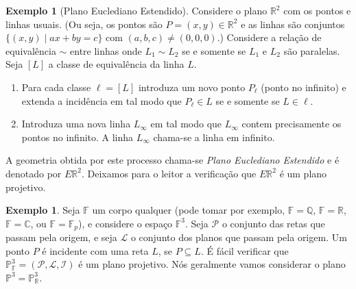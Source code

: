 \documentclass[12pt]{amsart}
\newcommand{\F}{\mathbb F}
\renewcommand{\L}{\mathbb L}
\newcommand{\Q}{\mathbb Q}
\newcommand{\C}{\mathbb C}
\newcommand{\R}{\mathbb R}
\theoremstyle{definition}
\newtheorem{example}[theorem]{Exemplo}
\renewcommand{\P}{\mathcal P}
\renewcommand{\L}{\mathcal L}
\newcommand{\I}{\mathcal I}
\newcommand{\PP}{\mathbb P}
\begin{document}
\begin{example}[Plano Euclediano Estendido]
    Considere o plano $\R^2$ com os pontos e linhas usuais. (Ou seja, os pontos são $P=(x,y)\in\R^2$ e as linhas 
    são conjuntos $\{(x,y)\mid ax+by=c\}$ com $(a,b,c)\neq (0,0,0)$.)
    Considere a relação de equivalência $\sim$ entre linhas 
    onde $L_1\sim L_2$ se e somente se $L_1$ e $L_2$ são paralelas. 
    Seja $[L]$ a classe de equivalência da linha $L$. 
    \begin{enumerate}
        \item Para cada classe $\ell=[L]$ introduza um novo ponto $P_\ell$ (ponto no infinito) e extenda 
    a incidência em tal modo que  $P_\ell\in L$ se e somente se $L\in \ell$.
    \item Introduza uma nova linha $L_\infty$ em tal modo que $L_\infty$ contem precisamente os pontos no infinito. A linha $L_\infty$ chama-se a linha em infinito.
    \end{enumerate}    
    A geometria obtida por este processo chama-se 
    \emph{Plano Euclediano Estendido} e é denotado por $E\R^2$. Deixamos para o leitor a verificação que $E\R^2$ é um plano projetivo.
\end{example}

\begin{example}
    Seja $\F$ um corpo qualquer (pode tomar por exemplo, $\F=\Q$, $\F=\R$, $\F=\C$, ou $\F=\F_p$), e considere 
    o espaço $\F^3$. Seja $\P$ o conjunto das retas que passam pela origem, e seja $\L$ o conjunto dos planos que passam pela origem. Um ponto $P$ é incidente com uma reta $L$, se $P\subseteq L$. É fácil verificar que 
    $\PP^3_\F=(\P,\L,\I)$ é um plano projetivo. Nós geralmente vamos considerar o plano $\PP^3=\PP^3_\R$. 
\end{example}
\end{document}
